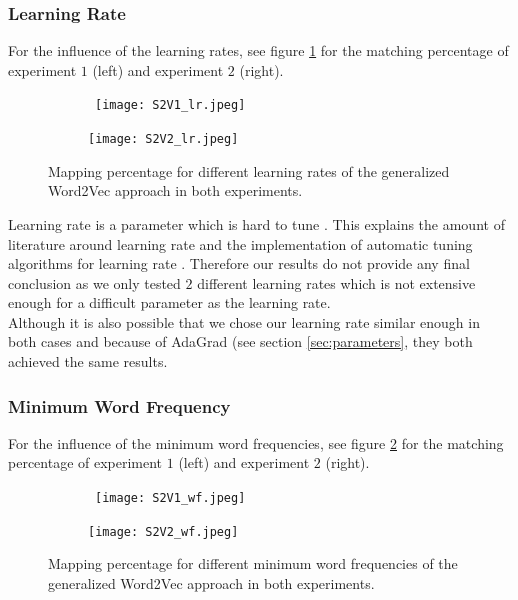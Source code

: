 \subsubsection{Learning Rate}

For the influence of the learning rates, see figure \ref{fig:s2v_lr} for the matching percentage of experiment $1$ (left) and experiment $2$ (right). \\

\begin{figure}[!htb]
	\centering
	\begin{subfigure}[b]{.49\textwidth}\
		\texttt{[image: S2V1\_lr.jpeg]}
	\end{subfigure}
	\begin{subfigure}[b]{.49\textwidth}
		\texttt{[image: S2V2\_lr.jpeg]}
	\end{subfigure}
	\caption{Mapping percentage for different learning rates of the generalized Word2Vec 		approach in both experiments.}
	\label{fig:s2v_lr}
\end{figure}

Learning rate is a parameter which is hard to tune \cite{peskyLr:article}. This explains the amount of literature around learning rate and the implementation of automatic tuning algorithms for learning rate \cite{peskyLr:article} \cite{adagrad:article} \cite{lrHard:article}. Therefore our results do not provide any final conclusion as we only tested $2$ different learning rates which is not extensive enough for a difficult parameter as the learning rate. \\
Although it is also possible that we chose our learning rate similar enough in both cases and because of AdaGrad (see section \ref{sec:parameters}, they both achieved the same results.

\subsubsection{Minimum Word Frequency}

For the influence of the minimum word frequencies, see figure \ref{fig:s2v_wf} for the matching percentage of experiment $1$ (left) and experiment $2$ (right). \\

\begin{figure}[!htb]
	\centering
	\begin{subfigure}[b]{.49\textwidth}\
		\texttt{[image: S2V1\_wf.jpeg]}
	\end{subfigure}
	\begin{subfigure}[b]{.49\textwidth}
		\texttt{[image: S2V2\_wf.jpeg]}
	\end{subfigure}
	\caption{Mapping percentage for different minimum word frequencies of the generalized Word2Vec approach in both experiments.}
	\label{fig:s2v_wf}
\end{figure}

